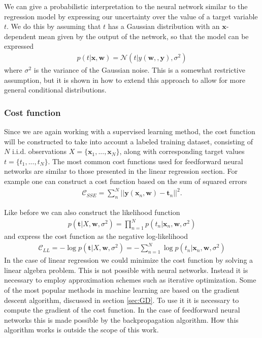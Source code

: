 \documentclass[twoside,english]{uiofysmaster}
\begin{document}
We can give a probabilistic interpretation to the neural network similar to the regression model by expressing our uncertainty over the value of a target variable $t$. We do this by assuming that $t$ has a Gaussian distribution with an $\bm{x}$-dependent mean given by the output of the network, so that the model can be expressed
\begin{align}
	p(t | \bm{x}, \bm{w}) = \mathcal{N} (t| y(\bm{w,}, \bm{y}), \sigma^2)
\end{align}
where $\sigma^2$ is the variance of the Gaussian noise. This is a somewhat restrictive assumption, but it is shown in \cite{Bishop2006} how to extend this approach to allow for more general conditional distributions. 




\subsubsection{Cost function}
Since we are again working with a supervised learning method, the cost function will be constructed to take into account a labeled training dataset, consisting of $N$ i.i.d. observations $X = \{ \bm{x}_1, ..., \bm{x}_N \}$, along with corresponding target values $t = \{ t_1, ..., t_N \}$. The most common cost functions used for feedforward neural networks are similar to those presented in the linear regression section. For example one can construct a cost function based on the sum of squared errors
\begin{align}
	\mathcal{C}_{SSE} = \sum_n^N || \bm{y} (\bm{x}_n, \bm{w}) - \bm{t}_n ||^2 .
\end{align}

Like before we can also construct the likelihood function
\begin{align}
	p(\bm{t}| X, \bm{w}, \sigma^2) = \prod_{n=1}^N p(t_n | \bm{x}_n, \bm{w}, \sigma^2)
\end{align}
and express the cost function as the negative log-likelihood
\begin{align}
	\mathcal{C}_{LL} = - \log p(\bm{t}| X, \bm{w}, \sigma^2) = -\sum_{n=1}^N \log  p(t_n | \bm{x}_n, \bm{w}, \sigma^2)
\end{align}
In the case of linear regression we could minimize the cost function by solving a linear algebra problem. This is not possible with neural networks. Instead it is necessary to employ approximation schemes such as iterative optimization. Some of the most popular methods in machine learning are based on the gradient descent algorithm, discussed in section \ref{sec:GD}. To use it it is necessary to compute the gradient of the cost function. In the case of feedforward neural networks this is made possible by the backpropagation algorithm. How this algorithm works is outside the scope of this work.
\end{document}
